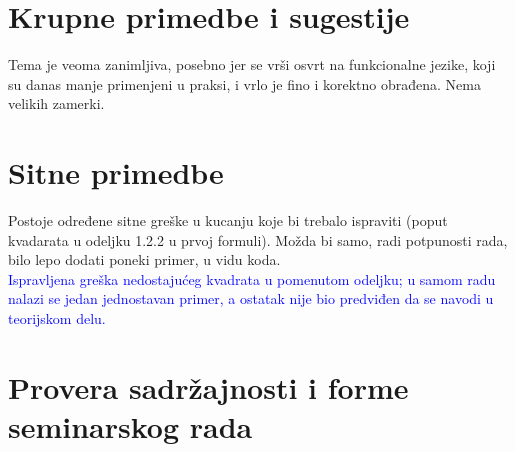 \documentclass[a4paper]{report}
\newcommand{\odgovor}[1]{\textcolor{blue}{#1}}
\begin{document}
\section{Krupne primedbe i sugestije}
Tema je veoma zanimljiva, posebno jer se vrši osvrt na funkcionalne jezike, koji su danas manje 
primenjeni u praksi, i vrlo je fino i korektno obrađena. Nema velikih zamerki.

\section{Sitne primedbe}
Postoje određene sitne greške u kucanju koje bi trebalo ispraviti (poput kvadarata u odeljku 1.2.2 
u prvoj formuli). Možda bi samo, radi potpunosti rada, bilo lepo dodati poneki primer, u vidu koda.\\
\odgovor {Ispravljena greška nedostajućeg kvadrata u pomenutom odeljku; u samom radu nalazi se jedan jednostavan primer, a ostatak nije bio predviđen da se navodi u teorijskom delu.}
\section{Provera sadržajnosti i forme seminarskog rada}
\end{document}
